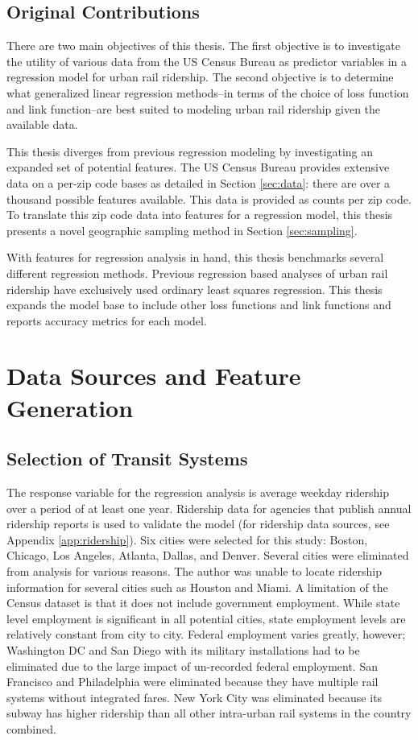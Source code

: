 \documentclass[11pt]{article}
\begin{document}
\subsection{Original Contributions}

There are two main objectives of this thesis. The first objective is to investigate the utility of various data from the US Census Bureau as predictor variables in a regression model for urban rail ridership. The second objective is to determine what generalized linear regression methods--in terms of the choice of loss function and link function--are best suited to modeling urban rail ridership given the available data.

This thesis diverges from previous regression modeling by investigating an expanded set of potential features. The US Census Bureau provides extensive data on a per-zip code bases as detailed in Section \ref{sec:data}: there are over a thousand possible features available. This data is provided as counts per zip code. To translate this zip code data into features for a regression model, this thesis presents a novel geographic sampling method in Section \ref{sec:sampling}. 

With features for regression analysis in hand, this thesis benchmarks several different regression methods. Previous regression based analyses of urban rail ridership have exclusively used ordinary least squares regression. This thesis expands the model base to include other loss functions and link functions and reports accuracy metrics for each model. 

\section{Data Sources and Feature Generation}

\subsection{Selection of Transit Systems}

The response variable for the regression analysis is average weekday ridership over a period of at least one year. Ridership data for agencies that publish annual ridership reports is used to validate the model (for ridership data sources, see Appendix \ref{app:ridership}). Six cities were selected for this study: Boston, Chicago, Los Angeles, Atlanta, Dallas, and Denver. Several cities were eliminated from analysis for various reasons. The author was unable to locate ridership information for several cities such as Houston and Miami. A limitation of the Census dataset is that it does not include government employment. While state level employment is significant in all potential cities, state employment levels are relatively constant from city to city. Federal employment varies greatly, however; Washington DC and San Diego with its military installations had to be eliminated due to the large impact of un-recorded federal employment. San Francisco and Philadelphia were eliminated because they have multiple rail systems without integrated fares. New York City was eliminated because its subway has higher ridership than all other intra-urban rail systems in the country combined.
\end{document}
